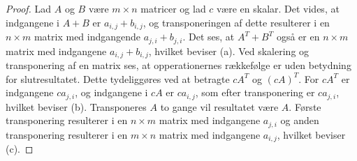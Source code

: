 %
\begin{proof}
Lad $A$ og $B$ være $m \times n$ matricer og lad $c$ være en skalar.
Det vides, at indgangene i $A+B$ er $a_{i,j} + b_{i,j}$, og transponeringen af dette resulterer i en $n \times m$ matrix med indgangende $a_{j,i} + b_{j,i}$.
Det ses, at  $A^T + B^T$ også er en $n \times m$ matrix med indgangene $a_{i,j} + b_{i,j}$, hvilket beviser (a).
Ved skalering og transponering af en matrix ses, at opperationernes rækkefølge er uden betydning for slutresultatet.
Dette tydeliggøres ved at betragte $cA^T$ og $(cA)^T$.
For $cA^T$ er indgangene $ca_{j,i}$, og indgangene i $cA$ er $ca_{i,j}$, som efter transponering er $ca_{j,i}$, hvilket beviser (b).
Transponeres $A$ to gange vil resultatet være $A$.
Første transponering resulterer i en $n \times m$ matrix med indgangene $a_{j,i}$ og anden transponering resulterer i en $m \times n$ matrix med indgangene $a_{i,j}$, hvilket beviser (c).
\end{proof}